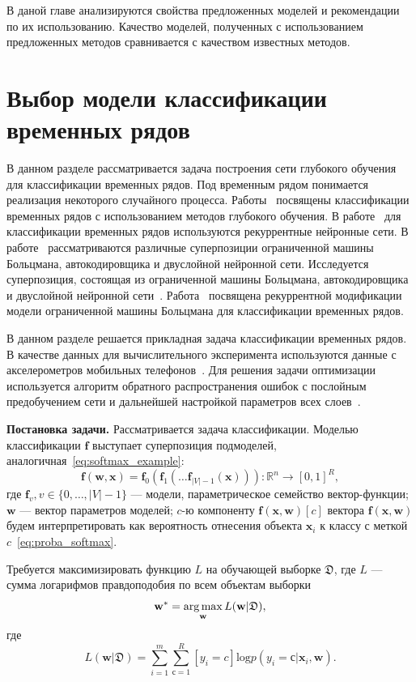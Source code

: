 В даной главе анализируются свойства предложенных моделей и рекомендации по их использованию. Качество моделей, полученных с использованием предложенных методов сравнивается с качеством
известных методов.
\section{Выбор модели классификации временных рядов}

В данном разделе рассматривается задача построения сети глубокого обучения для классификации временных рядов. Под временным рядом понимается реализация некоторого случайного процесса.  Работы~\cite{ts1,ts2,ts3} посвящены классификации временных рядов с использованием методов глубокого обучения. В работе~\cite{ts2}  для классификации временных рядов  используются рекуррентные нейронные сети. В работе~\cite{ts3} рассматриваются различные суперпозиции ограниченной машины Больцмана, автокодировщика и двуслойной нейронной сети. Исследуется суперпозиция, состоящая из ограниченной машины Больцмана, автокодировщика и двуслойной нейронной сети~\cite{founds}. Работа~\cite{recrbm} посвящена рекуррентной модификации модели ограниченной машины Больцмана для классификации временных рядов. 

В данном разделе решается прикладная задача классификации временных рядов. В качестве данных для вычислительного эксперимента используются данные с акселерометров мобильных телефонов~\cite{wisdm}. Для решения задачи оптимизации используется алгоритм обратного распространения ошибок с послойным предобучением сети и дальнейшей настройкой параметров всех слоев~\cite{finetuning}.

\textbf{Постановка задачи. }
Рассматривается задача классификации. 
Моделью классификации  $\mathbf{f}$ выступает суперпозиция подмоделей, аналогичная~\eqref{eq:softmax_example}:
\begin{equation}
\label{eq:wisdm_superposition}
 \mathbf{f}(\mathbf{w}, \mathbf{x}) = \mathbf{f}_0(\mathbf{f}_1(\dots \mathbf{f}_{|V|-1}(\mathbf{x}))): \mathbb{R}^n \to [0,1]^R,
\end{equation}
где $\mathbf{f}_v, v \in \{0,\dots,{|V|-1}\}$ --- модели, параметрическое семейство вектор-функции; $\mathbf{w}$ --- вектор параметров моделей;
$c$-ю компоненту $\mathbf{f}(\mathbf{x}, \mathbf{w})[c]$ вектора $\mathbf{f}(\mathbf{x},\mathbf{w})$ будем интерпретировать как вероятность отнесения объекта $\mathbf{x}_i$ к классу с меткой $c$~\eqref{eq:proba_softmax}.

Требуется максимизировать функцию $L$ на обучающей выборке $\mathfrak{D}$,
где $L$ --- сумма логарифмов правдоподобия по всем объектам выборки
\[
\mathbf{w}^{*} = \operatorname*{arg\,max}_\mathbf{w} L(\mathbf{w}|\mathfrak{D}),
\]
где
\[
 L(\mathbf{w}|\mathfrak{D}) = \sum_{i=1}^m \sum_{с=1}^R [y_i = c] \text{log} p(y_i=с|\mathbf{x}_i,\mathbf{w}).
\]

